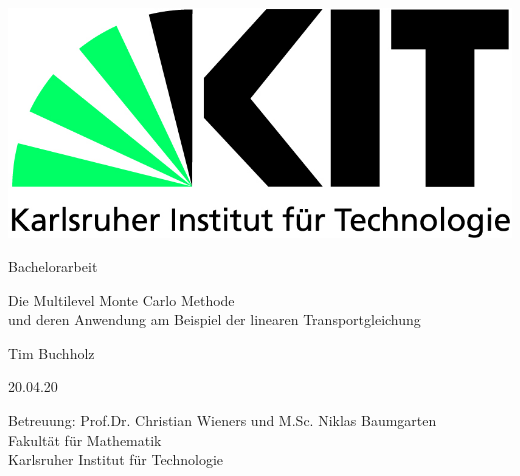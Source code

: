 \documentclass[12pt,a4paper]{scrartcl}
\theoremstyle{definition}
\numberwithin{equation}{section}
\begin{document}
  \pagestyle{empty}
  
  
  \begin{titlepage}

    \includegraphics[scale=0.45]{kit-logo.jpg} 
    \vspace*{2cm} 

 \begin{center} \large 
    
    Bachelorarbeit
    \vspace*{2cm}

    {\huge\linespread{1.6} Die Multilevel Monte Carlo Methode\\ und deren Anwendung am Beispiel der linearen\- Transportgleichung}
    \vspace*{2.5cm}

    Tim Buchholz
    \vspace*{1.5cm}

    20.04.20
    \vspace*{4.5cm}


    {Betreuung: Prof.Dr. Christian Wieners und M.Sc. Niklas Baumgarten \\[1cm]
    Fakultät für Mathematik \\
    Karlsruher Institut für Technologie}
  \end{center}
\end{titlepage}



  \tableofcontents

\newpage
 


  \pagestyle{headings}



%

 \newpage  %
 
\end{document}

